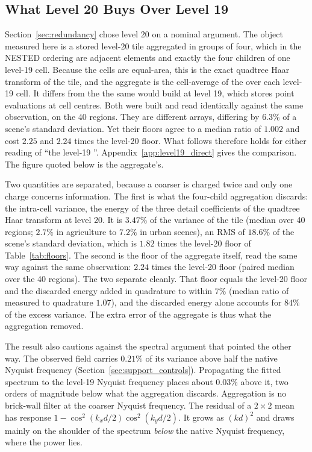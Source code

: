 \subsection{What Level 20 Buys Over Level 19}
\label{sec:level_choice}

Section~\ref{sec:redundancy} chose level 20 on a nominal argument. The
object measured here is a stored level-20 tile aggregated in groups of
four, which in the NESTED ordering are adjacent elements and exactly the
four children of one level-19 cell. Because the cells are equal-area,
this is the exact quadtree Haar transform of the tile, and the aggregate
is the cell-average of the  over each level-19 cell. It differs
from the  the same  would build at level 19, which stores
point evaluations at cell centres. Both were built and read identically
against the same observation, on the 40 regions. They are different arrays,
differing by $6.3\%$ of a scene's standard deviation. Yet their floors
agree to a median ratio of $1.002$ and cost $2.25$ and $2.24$ times the
level-20 floor. What follows therefore holds for either reading of ``the
level-19 ''. Appendix~\ref{app:level19_direct} gives the
comparison. The figure quoted below is
the aggregate's.

Two quantities are separated, because a coarser  is charged twice
and only one charge concerns information. The first is what the
four-child aggregation discards: the intra-cell variance, the energy of
the three detail coefficients of the quadtree Haar transform at level 20.
It is $3.47\%$ of the variance of the tile (median over 40 regions;
$2.7\%$ in agriculture to $7.2\%$ in urban scenes), an RMS of $18.6\%$ of the
scene's standard deviation, which is $1.82$ times the level-20 floor of
Table~\ref{tab:floors}. The second is the floor of the
aggregate itself, read the same way against the same observation: $2.24$
times the level-20 floor (paired median over the 40 regions). The two
separate cleanly. That floor equals the level-20 floor and the discarded
energy added in quadrature to within $7\%$ (median ratio of measured to
quadrature $1.07$), and the discarded energy alone accounts for $84\%$
of the excess variance. The extra error of the aggregate is thus what
the aggregation removed.

The result also cautions against the spectral argument that pointed the
other way. The observed field carries $0.21\%$
of its variance above half the native Nyquist frequency
(Section~\ref{sec:support_controls}). Propagating the fitted spectrum
to the level-19 Nyquist frequency places about $0.03\%$ above it, two
orders of magnitude below what the aggregation discards. Aggregation is
no brick-wall filter at the coarser Nyquist frequency. The residual of a
$2\times2$ mean has response $1-\cos^2(k_x d/2)\cos^2(k_y d/2)$. It
grows as $(kd)^2$ and draws mainly on the shoulder of the spectrum
\emph{below} the native Nyquist frequency, where the power lies.

